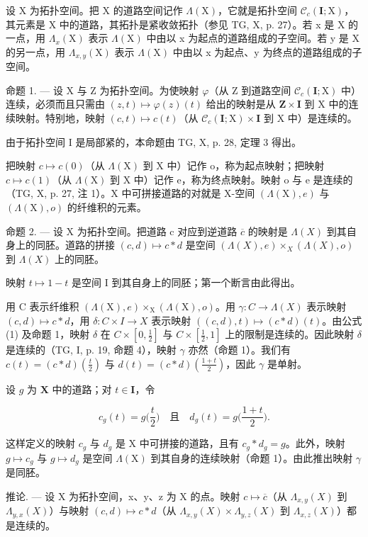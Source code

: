 设 X 为拓扑空间。把 X 的道路空间记作 \(\Lambda(\mathrm{X})\)，它就是拓扑空间 \(\mathcal{C}_{c}(\mathbf{I};\mathrm{X})\)，其元素是 X 中的道路，其拓扑是紧收敛拓扑（参见 TG, X, p. 27）。若 x 是 X 的一点，用 \(\Lambda_{x}(\mathrm{X})\) 表示 \(\Lambda(\mathrm{X})\) 中由以 x 为起点的道路组成的子空间。若 y 是 X 的另一点，用 \(\Lambda_{x,y}(\mathrm{X})\) 表示 \(\Lambda(\mathrm{X})\) 中由以 x 为起点、y 为终点的道路组成的子空间。

命题 1. --- 设 X 与 Z 为拓扑空间。为使映射 \(\varphi\)（从 Z 到道路空间 \(\mathcal{C}_c(\mathbf{I};\mathrm{X})\) 中）连续，必须而且只需由 \((z,t)\mapsto \varphi (z)(t)\) 给出的映射是从 \(\mathbf{Z}\times \mathbf{I}\) 到 X 中的连续映射。特别地，映射 \((c,t)\mapsto c(t)\)（从 \(\mathcal{C}_c(\mathbf{I};\mathrm{X})\times \mathbf{I}\) 到 X 中）是连续的。

由于拓扑空间 I 是局部紧的，本命题由 TG, X, p. 28, 定理 3 得出。

把映射 \(c \mapsto c(0)\)（从 \(\Lambda(\mathrm{X})\) 到 X 中）记作 o，称为起点映射；把映射 \(c \mapsto c(1)\)（从 \(\Lambda(\mathrm{X})\) 到 X 中）记作 e，称为终点映射。映射 o 与 e 是连续的（TG, X, p. 27, 注 1）。X 中可拼接道路的对就是 X-空间 \((\Lambda(\mathrm{X}), e)\) 与 \((\Lambda(\mathrm{X}), o)\) 的纤维积的元素。

命题 2. --- 设 X 为拓扑空间。把道路 c 对应到逆道路 \(\overline{c}\) 的映射是 \(\Lambda(X)\) 到其自身上的同胚。道路的拼接 \((c,d)\mapsto c*d\) 是空间 \((\Lambda(X),e)\times_{X}(\Lambda(X),o)\) 到 \(\Lambda(X)\) 上的同胚。

映射 \(t \mapsto 1 - t\) 是空间 I 到其自身上的同胚；第一个断言由此得出。

用 C 表示纤维积 \((\Lambda(\mathrm{X}),e)\times_{\mathrm{X}}(\Lambda(\mathrm{X}),o)\)。用 \(\gamma:C\to\Lambda(X)\) 表示映射 \((c,d)\mapsto c*d\)，用 \(\delta:C\times I\to X\) 表示映射 \(((c,d),t)\mapsto(c*d)(t)\)。由公式 (1) 及命题 1，映射 \(\delta\) 在 \(C\times[0,\frac{1}{2}]\) 与 \(C\times[\frac{1}{2},1]\) 上的限制是连续的。因此映射 \(\delta\) 是连续的（TG, I, p. 19, 命题 4），映射 \(\gamma\) 亦然（命题 1）。我们有 \(c(t)=(c*d)(\frac{t}{2})\) 与 \(d(t)=(c*d)(\frac{1+t}{2})\)，因此 \(\gamma\) 是单射。

设 \(g\) 为 \(\mathbf{X}\) 中的道路；对 \(t \in \mathbf{I}\)，令

\[
c _ {g} (t) = g \bigl (\frac {t}{2} \bigr) \quad \text{且} \quad d _ {g} (t) = g \bigl (\frac {1 + t}{2} \bigr).
\]

这样定义的映射 \(c_{g}\) 与 \(d_{g}\) 是 X 中可拼接的道路，且有 \(c_{g} * d_{g} = g\)。此外，映射 \(g \mapsto c_{g}\) 与 \(g \mapsto d_{g}\) 是空间 \(\Lambda(\mathrm{X})\) 到其自身的连续映射（命题 1）。由此推出映射 \(\gamma\) 是同胚。

推论. --- 设 X 为拓扑空间，x、y、z 为 X 的点。映射 \(c \mapsto \overline{c}\)（从 \(\Lambda_{x,y}(X)\) 到 \(\Lambda_{y,x}(X)\)）与映射 \((c,d) \mapsto c * d\)（从 \(\Lambda_{x,y}(X) \times \Lambda_{y,z}(X)\) 到 \(\Lambda_{x,z}(X)\)）都是连续的。

